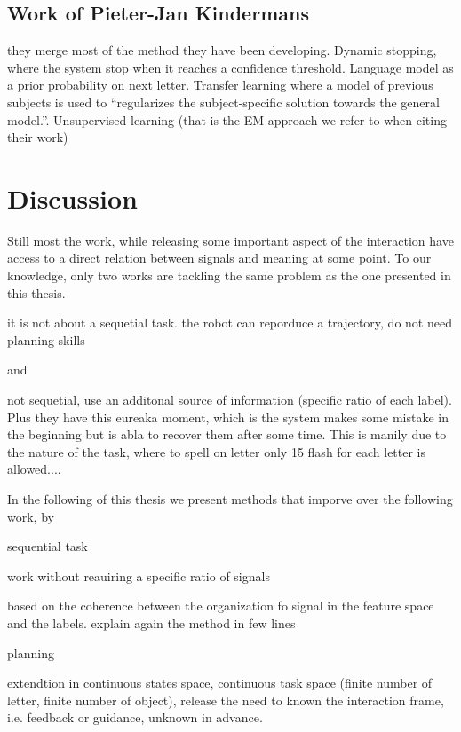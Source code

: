 \subsection{Work of Pieter-Jan Kindermans}

\cite{kindermans2014integrating} they merge most of the method they have been developing. Dynamic stopping, where the system stop when it reaches a confidence threshold. Language model as a prior probability on next letter. Transfer learning where a model of previous subjects is used to ``regularizes the subject-specific solution towards the general model.''. Unsupervised learning (that is the EM approach we refer to when citing their work)


\section{Discussion}

Still most the work, while releasing some important aspect of the interaction have access to a direct relation between signals and meaning at some point. To our knowledge, only two works are tackling the same problem as the one presented in this thesis.

 
\cite{cederborg2011imitating}
it is not about a sequetial task. the robot can reporduce a trajectory, do not need planning skills

and

\cite{Kindermans2012a,Kindermans2012b,kindermans2014integrating} not sequetial, use an additonal source of information (specific ratio of each label). Plus they have this eureaka moment, which is the system makes some mistake in the beginning but is abla to recover them after some time. This is manily due to the nature of the task, where to spell on letter only 15 flash for each letter is allowed....

In the following of this thesis we present methods that imporve over the following work, by

sequential task

work without reauiring a specific ratio of signals

based on the coherence between the organization fo signal in the feature space and the labels. explain again the method in few lines

planning

extendtion in continuous states space, continuous task space (finite number of letter, finite number of object), release the need to known the interaction frame, i.e. feedback or guidance, unknown in advance.

